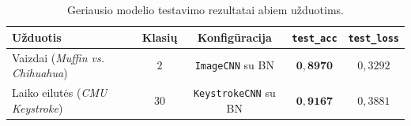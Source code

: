 \begin{table}[H]
    \centering
    \caption{Geriausio modelio testavimo rezultatai abiem užduotims.}
    \begin{tabular}{|l|c|c|c|c|}
        \hline
        Užduotis & Klasių & Konfigūracija & \texttt{test\_acc} & \texttt{test\_loss} \\
        \hline
        Vaizdai (\textit{Muffin vs. Chihuahua})       & $2$  & \texttt{ImageCNN} su BN     & $\mathbf{0{,}8970}$ & $0{,}3292$ \\
        \hline
        Laiko eilutės (\textit{CMU Keystroke})         & $30$ & \texttt{KeystrokeCNN} su BN & $\mathbf{0{,}9167}$ & $0{,}3881$ \\
        \hline
    \end{tabular}
    \label{tab:best_model_summary}
\end{table}
